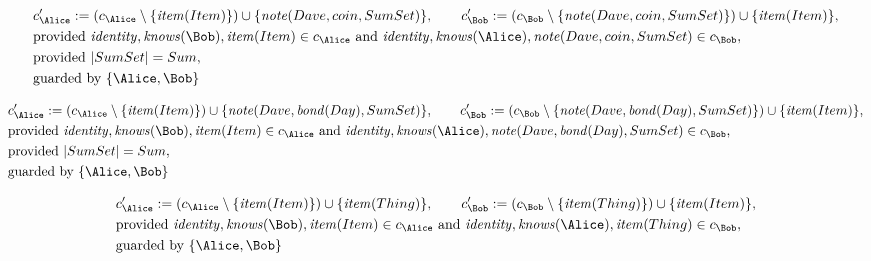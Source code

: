 \begin{align*}
&
c'_
{
\Alice
}
 := 
(c_
{
\Alice
}
 \setminus 
\{
\mathit{\detokenize{
item
}}
(
Item
)
\}
) \cup 
\{
\mathit{\detokenize{
note
}}
(
Dave
,
coin
,
SumSet
)
\}
, \qquad 
c'_
{
\Bob
}
 := 
(c_
{
\Bob
}
 \setminus 
\{
\mathit{\detokenize{
note
}}
(
Dave
,
coin
,
SumSet
)
\}
) \cup 
\{
\mathit{\detokenize{
item
}}
(
Item
)
\}
,\\
&
\text{provided } 
\mathit{\detokenize{
identity
}}
,
\mathit{\detokenize{
knows
}}
(
\Bob
)
,
\mathit{\detokenize{
item
}}
(
Item
)
 \in c_
{
\Alice
}
 \text{ and } 
\mathit{\detokenize{
identity
}}
,
\mathit{\detokenize{
knows
}}
(
\Alice
)
,
\mathit{\detokenize{
note
}}
(
Dave
,
coin
,
SumSet
)
 \in c_
{
\Bob
}
,\\
&
\text{provided } 
|
SumSet
|
=
Sum
,\\
&
\text{guarded by } \{
\Alice
,
\Bob
\}
\end{align*}

\begin{align*}
&
c'_
{
\Alice
}
 := 
(c_
{
\Alice
}
 \setminus 
\{
\mathit{\detokenize{
item
}}
(
Item
)
\}
) \cup 
\{
\mathit{\detokenize{
note
}}
(
Dave
,
\mathit{
bond
}(
Day
)
,
SumSet
)
\}
, \qquad 
c'_
{
\Bob
}
 := 
(c_
{
\Bob
}
 \setminus 
\{
\mathit{\detokenize{
note
}}
(
Dave
,
\mathit{
bond
}(
Day
)
,
SumSet
)
\}
) \cup 
\{
\mathit{\detokenize{
item
}}
(
Item
)
\}
,\\
&
\text{provided } 
\mathit{\detokenize{
identity
}}
,
\mathit{\detokenize{
knows
}}
(
\Bob
)
,
\mathit{\detokenize{
item
}}
(
Item
)
 \in c_
{
\Alice
}
 \text{ and } 
\mathit{\detokenize{
identity
}}
,
\mathit{\detokenize{
knows
}}
(
\Alice
)
,
\mathit{\detokenize{
note
}}
(
Dave
,
\mathit{
bond
}(
Day
)
,
SumSet
)
 \in c_
{
\Bob
}
,\\
&
\text{provided } 
|
SumSet
|
=
Sum
,\\
&
\text{guarded by } \{
\Alice
,
\Bob
\}
\end{align*}

\begin{align*}
&
c'_
{
\Alice
}
 := 
(c_
{
\Alice
}
 \setminus 
\{
\mathit{\detokenize{
item
}}
(
Item
)
\}
) \cup 
\{
\mathit{\detokenize{
item
}}
(
Thing
)
\}
, \qquad 
c'_
{
\Bob
}
 := 
(c_
{
\Bob
}
 \setminus 
\{
\mathit{\detokenize{
item
}}
(
Thing
)
\}
) \cup 
\{
\mathit{\detokenize{
item
}}
(
Item
)
\}
,\\
&
\text{provided } 
\mathit{\detokenize{
identity
}}
,
\mathit{\detokenize{
knows
}}
(
\Bob
)
,
\mathit{\detokenize{
item
}}
(
Item
)
 \in c_
{
\Alice
}
 \text{ and } 
\mathit{\detokenize{
identity
}}
,
\mathit{\detokenize{
knows
}}
(
\Alice
)
,
\mathit{\detokenize{
item
}}
(
Thing
)
 \in c_
{
\Bob
}
,\\
&
\text{guarded by } \{
\Alice
,
\Bob
\}
\end{align*}
